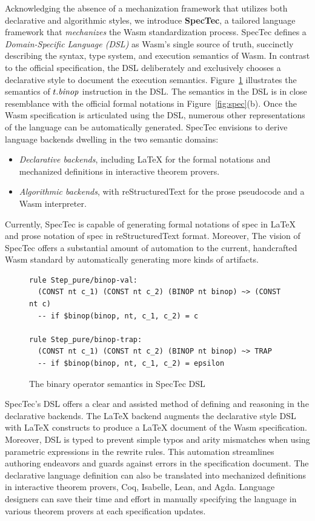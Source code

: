 Acknowledging the absence of a mechanization framework that utilizes both
declarative and algorithmic styles, we introduce \textbf{SpecTec}, a tailored
language framework that \textit{mechanizes} the Wasm standardization process.
SpecTec defines a \emph{Domain-Specific Language (DSL)} as Wasm's single source
of truth, succinctly describing the syntax, type system, and execution
semantics of Wasm.  In contrast to the official specification, the DSL
deliberately and exclusively chooses a declarative style to document the
execution semantics.  Figure~\ref{fig:dsl} illustrates the semantics of
$t.\mbox{\emph{binop}}$ instruction in the DSL.  The semantics in the DSL is in
close resemblance with the official formal notations in
Figure~\ref{fig:spec}(b).  Once the Wasm specification is articulated using the
DSL, numerous other representations of the language can be automatically
generated.  SpecTec envisions to derive language backends dwelling in the two
semantic domains: \begin{itemize} \item \textit{Declarative backends},
including LaTeX for the formal notations and mechanized definitions in
interactive theorem provers.  \item \textit{Algorithmic backends}, with
reStructuredText for the prose pseudocode and a Wasm interpreter.
\end{itemize} Currently, SpecTec is capable of generating formal notations of
spec in LaTeX and prose notation of spec in reStructuredText format. Moreover,
The vision of SpecTec offers a substantial amount of automation to the current,
handcrafted Wasm standard by automatically generating more kinds of artifacts.


\begin{figure}[t]
\footnotesize
\begin{verbatim}
rule Step_pure/binop-val:
  (CONST nt c_1) (CONST nt c_2) (BINOP nt binop) ~> (CONST nt c)
  -- if $binop(binop, nt, c_1, c_2) = c

rule Step_pure/binop-trap:
  (CONST nt c_1) (CONST nt c_2) (BINOP nt binop) ~> TRAP
  -- if $binop(binop, nt, c_1, c_2) = epsilon
\end{verbatim}
\caption{The binary operator semantics in SpecTec DSL}
\label{fig:dsl}
\end{figure}


SpecTec's DSL offers a clear and assisted method of defining and reasoning in
the declarative backends.  The LaTeX backend augments the declarative style DSL
with LaTeX constructs to produce a LaTeX document of the Wasm specification.
Moreover, DSL is typed to prevent simple typos and arity mismatches when using
parametric expressions in the rewrite rules.  This automation streamlines
authoring endeavors and guards against errors in the specification document.
The declarative language definition can also be translated into mechanized
definitions in interactive theorem provers, Coq, Isabelle, Lean, and Agda.
Language designers can save their time and effort in manually specifying the
language in various theorem provers at each specification updates.

